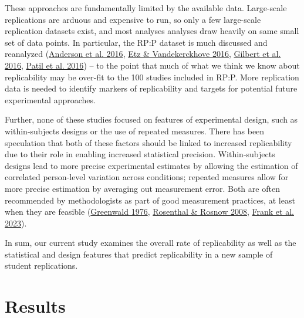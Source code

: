 \documentclass[
  english,
  a4paper,
]{article}
\begin{document}
These approaches are fundamentally limited by the available data. Large-scale replications are arduous and expensive to run, so only a few large-scale replication datasets exist, and most analyses analyses draw heavily on same small set of data points. In particular, the RP:P dataset is much discussed and reanalyzed (\protect\hyperlink{ref-anderson2016}{Anderson et al. 2016}, \protect\hyperlink{ref-etz2016}{Etz \& Vandekerckhove 2016}, \protect\hyperlink{ref-gilbert2016}{Gilbert et al. 2016}, \protect\hyperlink{ref-patil2016}{Patil et al. 2016}) -- to the point that much of what we think we know about replicability may be over-fit to the 100 studies included in RP:P. More replication data is needed to identify markers of replicability and targets for potential future experimental approaches.

Further, none of these studies focused on features of experimental design, such as within-subjects designs or the use of repeated measures. There has been speculation that both of these factors should be linked to increased replicability due to their role in enabling increased statistical precision. Within-subjects designs lead to more precise experimental estimates by allowing the estimation of correlated person-level variation across conditions; repeated measures allow for more precise estimation by averaging out measurement error. Both are often recommended by methodologists as part of good measurement practices, at least when they are feasible (\protect\hyperlink{ref-greenwald1976}{Greenwald 1976}, \protect\hyperlink{ref-rosenthal2008}{Rosenthal \& Rosnow 2008}, \protect\hyperlink{ref-frank2023}{Frank et al. 2023}).

In sum, our current study examines the overall rate of replicability as well as the statistical and design features that predict replicability in a new sample of student replications.

\hypertarget{results}{%
\section{Results}\label{results}}

    
\end{document}
